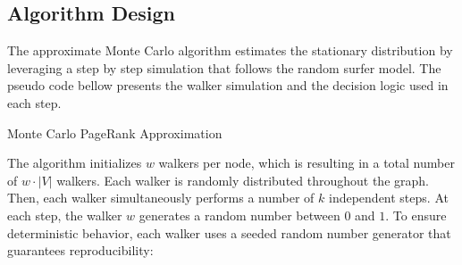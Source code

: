 \subsection{Algorithm Design}


The approximate Monte Carlo algorithm estimates the stationary distribution by leveraging a step by step simulation that follows the random surfer model.
The pseudo code bellow presents the walker simulation and the decision logic used in each step.

\vspace{0.5em}
\begin{algorithm}[H]
\caption{Monte Carlo PageRank Approximation}

\end{algorithm}
\vspace{0.5em}

The algorithm initializes $w$ walkers per node, which is resulting in a total number of $w\cdot |V|$ walkers. Each walker is randomly distributed throughout the graph. Then, each walker simultaneously performs a number of $k$ independent steps.
At each step, the walker $w$ generates a random number between $0$ and $1$. To ensure deterministic behavior, each walker uses a seeded random number generator that guarantees reproducibility:

